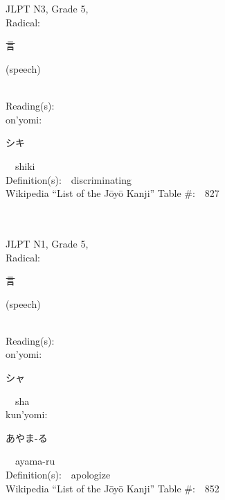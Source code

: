 \begin{multicols}{2}
\ \ \\
{\fontsize{34pt}{40pt}  }\ \ \\  %
{JLPT N3, Grade 5, \\Radical:\ \ {\begin{CJK}{UTF8}{min} 言 \end{CJK}} (speech) } \\
Reading(s):\ \ \\
{\hspace*{1em}}on'yomi:\ \ \\
{\hspace*{2em}}{\begin{CJK}{UTF8}{min} シキ \end{CJK}}\ \ shiki\ \ \\
Definition(s):\ \ discriminating \\
Wikipedia ``List of the J\=oy\=o Kanji'' Table \#:\ \ 827 \\
\ \ \\
{\fontsize{34pt}{40pt}  }\ \ \\  %
{JLPT N1, Grade 5, \\Radical:\ \ {\begin{CJK}{UTF8}{min} 言 \end{CJK}} (speech) } \\
Reading(s):\ \ \\
{\hspace*{1em}}on'yomi:\ \ \\
{\hspace*{2em}}{\begin{CJK}{UTF8}{min} シャ \end{CJK}}\ \ sha\ \ \\
{\hspace*{1em}}kun'yomi:\ \ \\
{\hspace*{2em}}{\begin{CJK}{UTF8}{min} あやま-る \end{CJK}}\ \ ayama-ru\ \ \\
Definition(s):\ \ apologize \\
Wikipedia ``List of the J\=oy\=o Kanji'' Table \#:\ \ 852 \\

\end{multicols}
